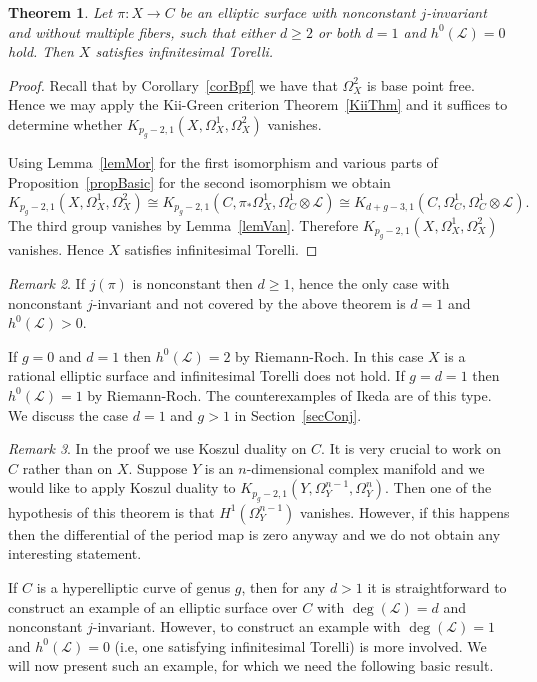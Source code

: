 \documentclass{amsart}
\newcommand{\cL}{\mathcal{L}}
\newtheorem{theorem}{Theorem}[section]
\theoremstyle{definition}
\theoremstyle{remark}
\newtheorem{remark}[theorem]{Remark}
\begin{document}
\begin{theorem}\label{mainThm} Let $\pi: X \to C$ be an elliptic surface with nonconstant $j$-invariant and without multiple fibers, such that either $d\geq 2$ or both $d=1$ and $h^0(\cL)=0$ hold. Then $X$ satisfies infinitesimal Torelli.
\end{theorem}
\begin{proof}
Recall that by Corollary~\ref{corBpf} we have that $\Omega^2_X$ is base point free. 
Hence we may apply the Kii-Green criterion  Theorem~\ref{KiiThm} and it suffices to determine  whether $K_{p_g-2,1}(X,\Omega^1_X,\Omega^2_X)$ vanishes.


Using Lemma~\ref{lemMor} for the first isomorphism and various parts of Proposition~\ref{propBasic} for the second isomorphism we obtain 
 \[ K_{p_g-2,1}(X,\Omega^1_X,\Omega^2_X)\cong   K_{p_g-2,1}(C,\pi_*\Omega^1_X,\Omega^1_C\otimes \cL)\cong K_{d+g-3,1}(C,\Omega^1_C,\Omega^1_C\otimes \cL).\]
 The third group vanishes by Lemma~\ref{lemVan}.  Therefore $K_{p_g-2,1}(X,\Omega^1_X,\Omega^2_X)$ vanishes. Hence $X$ satisfies infinitesimal Torelli. 
 \end{proof}




\begin{remark}
If $j(\pi)$ is nonconstant then $d\geq 1$, hence the only case with nonconstant $j$-invariant and not covered by the above theorem is $d=1$ and $h^0(\cL)>0$. 

If $g=0$ and $d=1$ then $h^0(\cL)=2$ by Riemann-Roch. In this case $X$ is a rational elliptic surface and infinitesimal Torelli does not hold.
If $g=d=1$ then $h^0(\cL)=1$ by Riemann-Roch. The counterexamples of  Ikeda \cite{IkedaTor} are of this type. We discuss the case $d=1$ and $g>1$ in Section~\ref{secConj}.
\end{remark}

\begin{remark} In the proof we use Koszul duality on $C$. It is very crucial to work on $C$ rather than on $X$. Suppose $Y$ is an $n$-dimensional complex manifold and we would like to apply Koszul duality \cite[Theorem 2.c.6]{GreenKos} to $K_{p_g-2,1}(Y,\Omega_Y^{n-1},\Omega_Y^n)$. Then one of the hypothesis of this theorem is that 
$H^1(\Omega_Y^{n-1})$ vanishes. However, if this happens then the differential of the period map is zero anyway and we do not obtain any interesting statement.
\end{remark}

If $C$ is a hyperelliptic curve of genus $g$, then for any $d>1$ it is straightforward to construct an example of an elliptic surface over $C$ with $\deg(\cL)=d$ and nonconstant $j$-invariant. However, to construct an example with $\deg(\cL)=1$ and $h^0(\cL)=0$ (i.e, one satisfying infinitesimal Torelli) is more involved. We will now present such an example, for which we need the following basic result.
\end{document}
